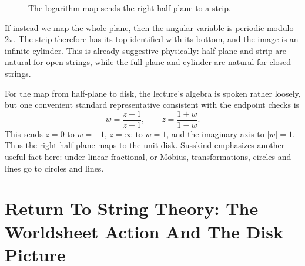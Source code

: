 \begin{figure}[h]
\centering
{}
\hspace{0.8cm}
\caption{The logarithm map sends the right half-plane to a strip.}
\end{figure}

If instead we map the whole plane, then the angular variable is periodic modulo \(2\pi\). The strip therefore has its top identified with its bottom, and the image is an infinite cylinder. This is already suggestive physically: half-plane and strip are natural for open strings, while the full plane and cylinder are natural for closed strings.

For the map from half-plane to disk, the lecture's algebra is spoken rather loosely, but one convenient standard representative consistent with the endpoint checks is
\begin{equation}
w=\frac{z-1}{z+1}, \qquad z=\frac{1+w}{1-w}.
\end{equation}
This sends \(z=0\) to \(w=-1\), \(z=\infty\) to \(w=1\), and the imaginary axis to \(|w|=1\). Thus the right half-plane maps to the unit disk. Susskind emphasizes another useful fact here: under linear fractional, or M\"obius, transformations, circles and lines go to circles and lines.

\section{Return To String Theory: The Worldsheet Action And The Disk Picture}

